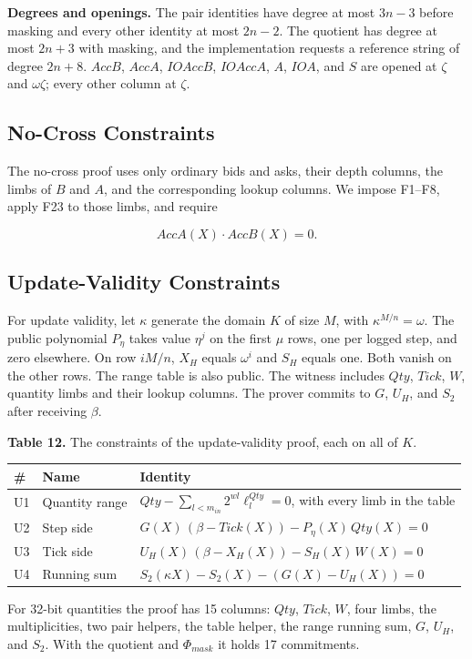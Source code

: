 \textbf{Degrees and openings.} The pair identities have degree at most \(3n - 3\) before masking and every other identity at most \(2n - 2\). The quotient has degree at most \(2n + 3\) with masking, and the implementation requests a reference string of degree \(2n + 8\). \(AccB\), \(AccA\), \(IOAccB\), \(IOAccA\), \(A\), \(IOA\), and \(S\) are opened at \(\zeta\) and \(\omega\zeta\); every other column at \(\zeta\).

\subsection{No-Cross Constraints}

The no-cross proof uses only ordinary bids and asks, their depth columns, the limbs of \(B\) and \(A\), and the corresponding lookup columns. We impose F1--F8, apply F23 to those limbs, and require

\[AccA(X) \cdot AccB(X) = 0.\]

\subsection{Update-Validity Constraints}

For update validity, let \(\kappa\) generate the domain \(K\) of size \(M\), with \(\kappa^{M/n}=\omega\). The public polynomial \(P_\eta\) takes value \(\eta^j\) on the first \(\mu\) rows, one per logged step, and zero elsewhere. On row \(iM/n\), \(X_H\) equals \(\omega^i\) and \(S_H\) equals one. Both vanish on the other rows. The range table is also public. The witness includes \(Qty\), \(Tick\), \(W\), quantity limbs and their lookup columns. The prover commits to \(G\), \(U_H\), and \(S_2\) after receiving \(\beta\).

\textbf{Table 12.} The constraints of the update-validity proof, each on all of \(K\).

\begin{longtable}[]{@{}lll@{}}
\toprule\noalign{}
\# & Name & Identity \\
\midrule\noalign{}
\endhead
\bottomrule\noalign{}
\endlastfoot
U1 & Quantity range & \(Qty - \sum_{l<m_{in}} 2^{wl} \ell^{Qty}_l = 0\), with every limb in the table \\
U2 & Step side & \(G(X)\,(\beta - Tick(X)) - P_\eta(X)\,Qty(X) = 0\) \\
U3 & Tick side & \(U_H(X)\,(\beta - X_H(X)) - S_H(X)\,W(X) = 0\) \\
U4 & Running sum & \(S_2(\kappa X) - S_2(X) - (G(X) - U_H(X)) = 0\) \\
\end{longtable}

For 32-bit quantities the proof has 15 columns: \(Qty\), \(Tick\), \(W\), four limbs, the multiplicities, two pair helpers, the table helper, the range running sum, \(G\), \(U_H\), and \(S_2\). With the quotient and \(\Phi_{mask}\) it holds 17 commitments.
